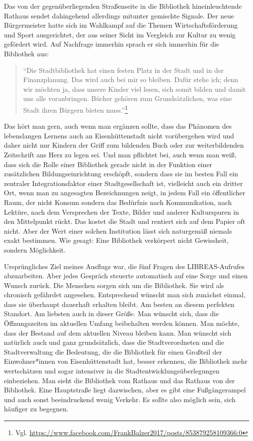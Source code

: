 \documentclass[a4paper,
fontsize=11pt,
oneside,
numbers=noperiodatend,
parskip=half-,
bibliography=totoc,
final
]{scrartcl}
\begin{document}
Das von der gegenüberliegenden Straßenseite in die Bibliothek
hineinleuchtende Rathaus sendet dahingehend allerdings mitunter
gemischte Signale. Der neue Bürgermeister hatte sich im Wahlkampf auf
die Themen Wirtschaftsförderung und Sport ausgerichtet, der aus seiner
Sicht im Vergleich zur Kultur zu wenig gefördert wird. Auf Nachfrage
immerhin sprach er sich immerhin für die Bibliothek aus:

\begin{quote}
\enquote{Die Stadtbibliothek hat einen festen Platz in der Stadt und in
der Finanzplanung. Das wird auch bei mir so bleiben. Dafür stehe ich;
denn wir möchten ja, dass unsere Kinder viel lesen, sich somit bilden
und damit uns alle voranbringen. Bücher gehören zum Grundsätzlichen, was
eine Stadt ihren Bürgern bieten muss.}\footnote{Vgl.
  \url{https://www.facebook.com/FrankBalzer2017/posts/853879258109366:0}}
\end{quote}

Das hört man gern, auch wenn man ergänzen sollte, dass das Phänomen des
lebenslangen Lernens auch an Eisenhüttenstadt nicht vorübergehen wird
und daher nicht nur Kindern der Griff zum bildenden Buch oder zur
weiterbildenden Zeitschrift ans Herz zu legen sei. Und man pflichtet
bei, auch wenn man weiß, dass sich die Rolle einer Bibliothek gerade
nicht in der Funktion einer zusätzlichen Bildungseinrichtung erschöpft,
sondern dass sie im besten Fall ein zentraler Integrationsfaktor einer
Stadtgesellschaft ist, vielleicht auch ein dritter Ort, wenn man zu
angesagten Bezeichnungen neigt, in jedem Fall ein öffentlicher Raum, der
nicht Konsum sondern das Bedürfnis nach Kommunikation, nach Lektüre,
nach dem Versprechen der Texte, Bilder und anderer Kulturspuren in den
Mittelpunkt rückt. Das kostet die Stadt und rentiert sich auf dem Papier
oft nicht. Aber der Wert einer solchen Institution lässt sich naturgemäß
niemals exakt bestimmen. Wie gesagt: Eine Bibliothek verkörpert nicht
Gewissheit, sondern Möglichkeit.

Ursprüngliches Ziel meines Ausflugs war, die fünf Fragen des
LIBREAS-Aufrufes abzuarbeiten. Aber jedes Gespräch steuerte automatisch
auf eine Sorge und einen Wunsch zurück. Die Menschen sorgen sich um die
Bibliothek. Sie wird als chronisch gefährdet angesehen. Entsprechend
wünscht man sich zunächst einmal, dass sie überhaupt dauerhaft erhalten
bleibt. Am besten an diesem perfekten Standort. Am liebsten auch in
dieser Größe. Man wünscht sich, dass die Öffnungszeiten im aktuellen
Umfang beibehalten werden können. Man möchte, dass der Bestand auf dem
aktuellen Niveau bleiben kann. Man wünscht sich natürlich auch und ganz
grundsätzlich, dass die Stadtverordneten und die Stadtverwaltung die
Bedeutung, die die Bibliothek für einen Großteil der Einwohner*innen von
Eisenhüttenstadt hat, besser erkennen, die Bibliothek mehr wertschätzen
und sogar intensiver in die Stadtentwicklungsüberlegungen einbeziehen.
Man sieht die Bibliothek vom Rathaus und das Rathaus von der Bibliothek.
Eine Hauptstraße liegt dazwischen, aber es gibt eine Fußgängerampel und
auch sonst beeindruckend wenig Verkehr. Es sollte also möglich sein,
sich häufiger zu begegnen.
\end{document}
